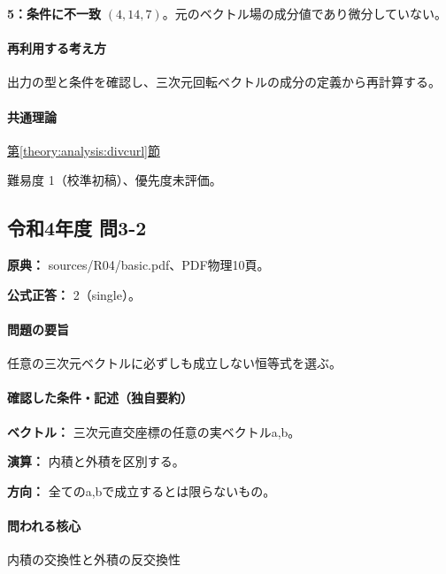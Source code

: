 \noindent\textbf{5：条件に不一致} \((4,14,7)\)。元のベクトル場の成分値であり微分していない。\par

\paragraph{再利用する考え方} 出力の型と条件を確認し、三次元回転ベクトルの成分の定義から再計算する。

\paragraph{共通理論} \hyperref[theory:analysis:divcurl]{第\ref*{theory:analysis:divcurl}節}

\par 難易度 1（校準初稿）、優先度未評価。

\subsection{令和4年度 問3-2}
\label{q:r04-reg-basic-3-2}

\noindent\textbf{原典：} sources/R04/basic.pdf、PDF物理10頁。

\textbf{公式正答：} 2（single）。

\paragraph{問題の要旨} 任意の三次元ベクトルに必ずしも成立しない恒等式を選ぶ。

\paragraph{確認した条件・記述（独自要約）}\mbox{}\par

\noindent\textbf{ベクトル：} 三次元直交座標の任意の実ベクトルa,b。\par

\noindent\textbf{演算：} 内積と外積を区別する。\par

\noindent\textbf{方向：} 全てのa,bで成立するとは限らないもの。\par

\paragraph{問われる核心} 内積の交換性と外積の反交換性

